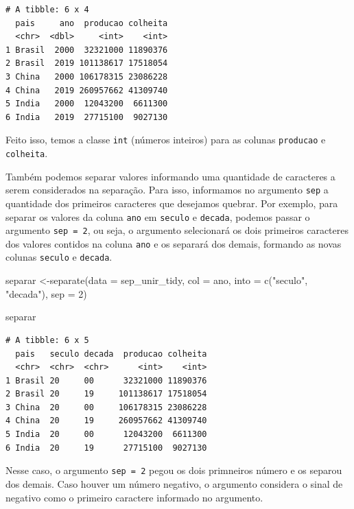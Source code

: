 \documentclass[
  brazilian,
]{book}
\newenvironment{Shaded}{\begin{snugshade}}{\end{snugshade}}
\newcommand{\AttributeTok}[1]{\textcolor[rgb]{0.77,0.63,0.00}{#1}}
\newcommand{\DecValTok}[1]{\textcolor[rgb]{0.00,0.00,0.81}{#1}}
\newcommand{\FunctionTok}[1]{\textcolor[rgb]{0.00,0.00,0.00}{#1}}
\newcommand{\NormalTok}[1]{#1}
\newcommand{\OtherTok}[1]{\textcolor[rgb]{0.56,0.35,0.01}{#1}}
\newcommand{\StringTok}[1]{\textcolor[rgb]{0.31,0.60,0.02}{#1}}
\begin{document}
\begin{verbatim}
# A tibble: 6 x 4
  pais     ano  producao colheita
  <chr>  <dbl>     <int>    <int>
1 Brasil  2000  32321000 11890376
2 Brasil  2019 101138617 17518054
3 China   2000 106178315 23086228
4 China   2019 260957662 41309740
5 India   2000  12043200  6611300
6 India   2019  27715100  9027130
\end{verbatim}

Feito isso, temos a classe \texttt{int} (números inteiros) para as colunas \texttt{producao} e \texttt{colheita}.

Também podemos separar valores informando uma quantidade de caracteres a serem considerados na separação. Para isso, informamos no argumento \texttt{sep} a quantidade dos primeiros caracteres que desejamos quebrar. Por exemplo, para separar os valores da coluna \texttt{ano} em \texttt{seculo} e \texttt{decada}, podemos passar o argumento \texttt{sep\ =\ 2}, ou seja, o argumento selecionará os dois primeiros caracteres dos valores contidos na coluna \texttt{ano} e os separará dos demais, formando as novas colunas \texttt{seculo} e \texttt{decada}.

\begin{Shaded}
\begin{Highlighting}[]
\NormalTok{separar }\OtherTok{\textless{}{-}}\FunctionTok{separate}\NormalTok{(}\AttributeTok{data =}\NormalTok{ sep\_unir\_tidy,}
                   \AttributeTok{col =}\NormalTok{ ano,}
                   \AttributeTok{into =} \FunctionTok{c}\NormalTok{(}\StringTok{"seculo"}\NormalTok{, }\StringTok{"decada"}\NormalTok{),}
                   \AttributeTok{sep =} \DecValTok{2}\NormalTok{)}

\NormalTok{separar}
\end{Highlighting}
\end{Shaded}

\begin{verbatim}
# A tibble: 6 x 5
  pais   seculo decada  producao colheita
  <chr>  <chr>  <chr>      <int>    <int>
1 Brasil 20     00      32321000 11890376
2 Brasil 20     19     101138617 17518054
3 China  20     00     106178315 23086228
4 China  20     19     260957662 41309740
5 India  20     00      12043200  6611300
6 India  20     19      27715100  9027130
\end{verbatim}

Nesse caso, o argumento \texttt{sep\ =\ 2} pegou os dois primneiros número e os separou dos demais. Caso houver um número negativo, o argumento considera o sinal de negativo como o primeiro caractere informado no argumento.
\end{document}
